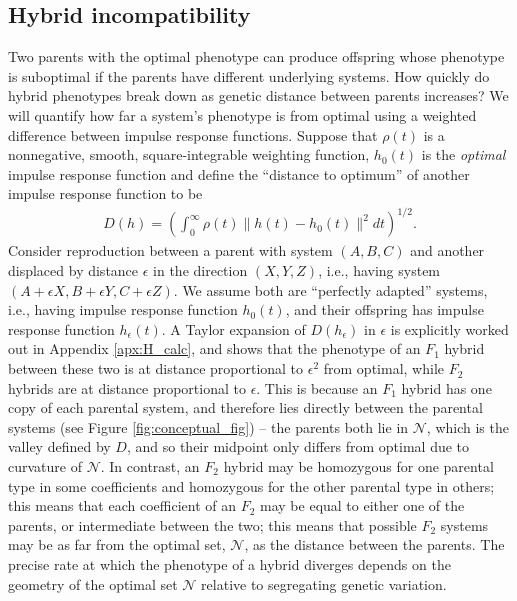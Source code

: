 \documentclass{article}
\newcommand{\1}{\mathbbm{1}}
\newcommand{\allS}{\mathcal{N}}
\begin{document}
\subsection*{Hybrid incompatibility}
Two parents with the optimal phenotype can produce offspring whose phenotype is suboptimal
if the parents have different underlying systems.
How quickly do hybrid phenotypes break down as genetic distance between parents increases?
We will quantify how far a system's phenotype is from optimal
using a weighted difference between impulse response functions.
Suppose that $\rho(t)$ is a nonnegative, smooth, square-integrable weighting function,
$h_0(t)$ is the \emph{optimal} impulse response function
and define the ``distance to optimum'' of another impulse response function
to be
\begin{align}
\label{eqn:distance}
	D(h) = \left( \int_0^\infty \rho(t) \|h(t) - h_0(t)\|^2 dt \right)^{1/2} .
\end{align}
Consider reproduction between a parent with system $(A, B, C)$ 
and another displaced by distance $\epsilon$ in the direction $(X,Y,Z)$,
i.e., having  system $(A + \epsilon X, B + \epsilon Y, C + \epsilon Z)$.
We assume both are ``perfectly adapted'' systems, 
i.e., having impulse response function $h_0(t)$,
and their offspring has impulse response function $h_\epsilon(t)$.
A Taylor expansion of $D(h_\epsilon)$ in $\epsilon$ is explicitly worked out in Appendix \ref{apx:H_calc},
and shows that the phenotype of an $F_1$ hybrid between these two is at distance proportional to $\epsilon^2$ from optimal,
while $F_2$ hybrids are at distance proportional to $\epsilon$.
This is because an $F_1$ hybrid has one copy of each parental system,
and therefore lies directly between the parental systems (see Figure \ref{fig:conceptual_fig}) --
the parents both lie in $\allS$, which is the valley defined by $D$,
and so their midpoint only differs from optimal due to curvature of $\allS$.
In contrast, an $F_2$ hybrid may be homozygous for one parental type in some coefficients
and homozygous for the other parental type in others;
this means that each coefficient of an $F_2$ may be equal to either one of the parents,
or intermediate between the two;
this means that possible $F_2$ systems may be as far from the optimal set, $\allS$,
as the distance between the parents.
The precise rate at which the phenotype of a hybrid diverges depends on the geometry
of the optimal set $\allS$ relative to segregating genetic variation.
\end{document}
